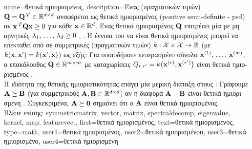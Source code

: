 {name={\foreignlanguage{greek}{θετικά ημιορισμένος}},
	description={\foreignlanguage{greek}{Ένας}  
		\foreignlanguage{greek}{(πραγματικών τιμών)} $\mathbf{Q} = \mathbf{Q}\,^{T} \in \mathbb{R}^{d \times d}$ 
		\foreignlanguage{greek}{αναφέρεται ως θετικά ημιορισμένος} (positive semi-definite - psd) \foreignlanguage{greek}{αν 
		${\bf x}\,^{T} \mathbf{Q} {\bf x} \geq 0$ για κάθε}  ${\bf x} \in \mathbb{R}^{d}$. 
		\foreignlanguage{greek}{Ένας θετικά ημιορισμένος}  $\mathbf{Q}$ \foreignlanguage{greek}{επιτρέπει μία} 
		 \foreignlanguage{greek}{με μη αρνητκές}  
		$\lambda_{1}, \,\ldots, \,\lambda_{d} \geq 0$ \cite{Axler2025}, \cite{HornMatAnalysis}. 
		\foreignlanguage{greek}{Η έννοια του να είναι θετικά ημιορισμένος μπορεί να επεκταθεί 
		από}  \foreignlanguage{greek}{σε συμμετρικές}   
		\foreignlanguage{greek}{(πραγματικών τιμών)} $k: \mathcal{X} \times \mathcal{X} \rightarrow \mathbb{R}$ 
		(\foreignlanguage{greek}{με $k({\bf x},{\bf x}') = k({\bf x}',{\bf x})$) ως εξής: Για οποιοδήποτε 
		πεπερασμένο σύνολο}  ${\bf x}^{(1)}, \,\ldots, \,{\bf x}^{(m)}$, \foreignlanguage{greek}{ο 
		επακόλουθος}  $\mathbf{Q} \in \mathbb{R}^{m \times m}$ \foreignlanguage{greek}{με 
		καταχωρίσεις $Q_{r,r'} = k\big({\bf x}^{(r)},{\bf x}^{(r')}\big)$ 
		είναι θετικά ημιορισμένος} \cite{LearningKernelsBook}.
		\\
		\foreignlanguage{greek}{Η ιδιότητα της θετικής ημιοριστικότητας επάγει μία μερική διάταξη στους} :
		\foreignlanguage{greek}{Γράφουμε ${\bf A} \succeq {\bf B}$ (για συμμετρικούς ${\bf A}, {\bf B} \in \mathbb{R}^{d \times d}$)
		αν η διαφορά ${\bf A} - {\bf B}$ είναι θετικά ημιορισμένη} \cite[\foreignlanguage{greek}{Ενότητα} 2.4]{BoydConvexBook}. 
		\foreignlanguage{greek}{Συγκεκριμένα, ${\bf A} \succeq \mathbf{0}$ σημαίνει ότι ο ${\bf A}$ είναι θετικά ημιορισμένος}.
			\\
		\foreignlanguage{greek}{Βλέπε επίσης:} \gls{symmetricmatrix}, \gls{vector}, \gls{matrix}, \gls{spectraldecomp}, \gls{eigenvalue}, 
		\gls{kernel}, \gls{map}, \gls{featurevec}.},
	first={\foreignlanguage{greek}{θετικά ημιορισμένος}},
	text={\foreignlanguage{greek}{θετικά ημιορισμένος}},
	type=math,
	user1={\foreignlanguage{greek}{θετικά ημιορισμένος}}, %
  	user2={\foreignlanguage{greek}{θετικά ημιορισμένου}}, %
	user3={\foreignlanguage{greek}{θετικά ημιορισμένο}}, %
	user4={\foreignlanguage{greek}{θετικά ημιορισμένη}} %
}


